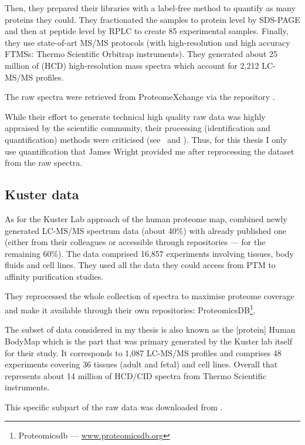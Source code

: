 Then, they prepared their libraries with a label-free method to quantify
as many proteins they could. They fractionated the samples to protein level by
\gls{SDS-PAGE} and then at peptide level by \gls{RPLC} to create 85 experimental
samples. Finally, they use state-of-art \gls{MS/MS} protocols
(with high-resolution and high accuracy \glspl{FTMS}:
Thermo Scientific Orbitrap instruments).
They generated about 25 million of (\gls{HCD})
high-resolution mass spectra which account for 2,212 \gls{LC-MS/MS} profiles.

The raw spectra were retrieved from ProteomeXchange via the repository
.

While their effort to generate technical high quality raw data was highly
appraised by the scientific community, their processing
(identification and quantification) methods were
criticised (see~\cite{Ezkurdia2014-qx} and \cite{Deutsch2015}).
Thus, for this thesis I only use
quantification that James Wright provided me after reprocessing the dataset
from the raw spectra.

\subsection{Kuster data}

As for the Kuster Lab approach of the human proteome map,
\cite{KusterData} combined newly generated \gls{LC-MS/MS} spectrum
data (about 40\%) with already published one
(either from their colleagues or accessible through repositories ---
for the remaining 60\%).
The data comprised 16,857 experiments involving tissues, body fluids and cell
lines. They used all the data they could access from \gls{PTM} to affinity
purification studies.

They reprocessed the whole collection of spectra to maximise proteome coverage
and make it available through their own repositories: ProteomicsDB\footnote{%
Proteomicsdb --- %
\href{https://www.proteomicsdb.org/}{www.proteomicsdb.org}}.

The subset of data considered in my thesis is also
known as the [protein] Human BodyMap which is the part that was primary generated
by the Kuster lab itself for their study. It corresponds to 1,087 \gls{LC-MS/MS}
profiles and comprises 48 experiments covering 36 tissues (adult and fetal) and
cell lines. Overall that represents about 14 million of \gls{HCD}/\gls{CID}
spectra from Thermo Scientific instruments.

This specific subpart of the raw data was downloaded from .

